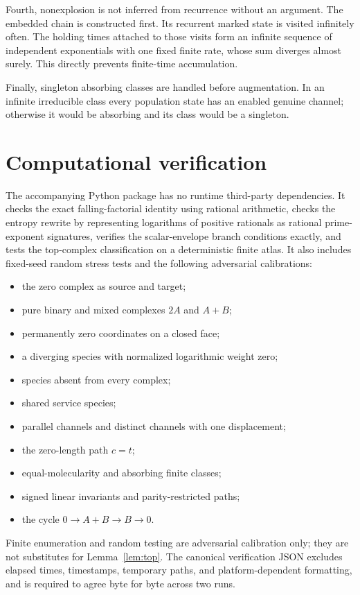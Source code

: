 Fourth, nonexplosion is not inferred from recurrence without an argument.
The embedded chain is constructed first.  Its recurrent marked state is
visited infinitely often.  The holding times attached to those visits form
an infinite sequence of independent exponentials with one fixed finite rate,
whose sum diverges almost surely.  This directly prevents finite-time
accumulation.

Finally, singleton absorbing classes are handled before augmentation.  In an
infinite irreducible class every population state has an enabled genuine
channel; otherwise it would be absorbing and its class would be a singleton.

\section{Computational verification}\label{app:verification}

The accompanying Python package has no runtime third-party dependencies.  It
checks the exact falling-factorial identity using rational arithmetic, checks
the entropy rewrite by representing logarithms of positive rationals as
rational prime-exponent signatures, verifies the scalar-envelope branch
conditions exactly, and tests the top-complex classification on a
deterministic finite atlas.  It also includes fixed-seed random stress tests
and the following adversarial calibrations:

\begin{itemize}[leftmargin=2em,itemsep=0pt,topsep=0.1em,parsep=0pt,partopsep=0pt]
\item the zero complex as source and target;
\item pure binary and mixed complexes \(2A\) and \(A+B\);
\item permanently zero coordinates on a closed face;
\item a diverging species with normalized logarithmic weight zero;
\item species absent from every complex;
\item shared service species;
\item parallel channels and distinct channels with one displacement;
\item the zero-length path \(c=t\);
\item equal-molecularity and absorbing finite classes;
\item signed linear invariants and parity-restricted paths;
\item the cycle \(0\to A+B\to B\to0\).
\end{itemize}

Finite enumeration and random testing are adversarial calibration only; they
are not substitutes for Lemma~\ref{lem:top}.  The canonical verification JSON
excludes elapsed times, timestamps, temporary paths, and platform-dependent
formatting, and is required to agree byte for byte across two runs.
